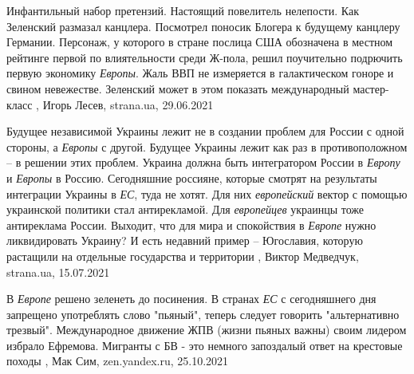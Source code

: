 Инфантильный набор претензий. Настоящий повелитель нелепости.  Как Зеленский
размазал канцлера.  Посмотрел поносик Блогера к будущему канцлеру Германии.
Персонаж, у которого в стране послица США обозначена в местном рейтинге первой
по влиятельности среди Ж-пола, решил поучительно подрючить первую экономику
\emph{Европы}. Жаль ВВП не измеряется в галактическом гоноре и свином
невежестве. Зеленский может в этом показать международный мастер-класс
, 
Игорь Лесев, strana.ua, 29.06.2021

Будущее независимой Украины лежит не в создании проблем для России с одной
стороны, а \emph{Европы} с другой. Будущее Украины лежит как раз в противоположном – в
решении этих проблем. Украина должна быть интегратором России в \emph{Европу} и \emph{Европы}
в Россию. Сегодняшние россияне, которые смотрят на результаты интеграции
Украины в \emph{ЕС}, туда не хотят. Для них \emph{европейский} вектор с помощью украинской
политики стал антирекламой.  Для \emph{европейцев} украинцы тоже антиреклама России.
Выходит, что для мира и спокойствия в \emph{Европе} нужно ликвидировать Украину? И
есть недавний пример – Югославия, которую растащили на отдельные государства и
территории
, 
Виктор Медведчук, strana.ua, 15.07.2021

В \emph{Европе} решено зеленеть до посинения.  В странах \emph{ЕС} с сегодняшнего дня
запрещено употреблять слово "пьяный", теперь следует говорить "альтернативно
трезвый". Международное движение ЖПВ (жизни пьяных важны) своим лидером избрало
Ефремова.  Мигранты с БВ - это немного запоздалый ответ на крестовые походы
, Мак Сим, zen.yandex.ru, 25.10.2021
